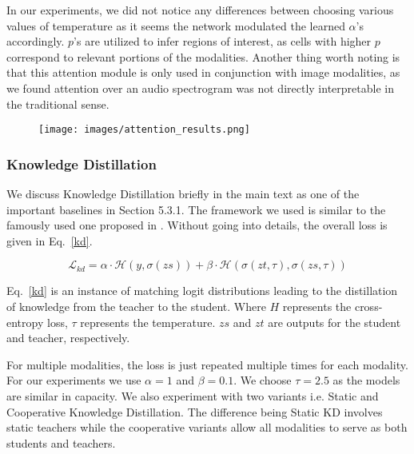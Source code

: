 \documentclass[final]{cvpr}
\begin{document}
In our experiments, we did not notice any differences between choosing various values of temperature as it seems the network modulated the learned $\alpha$'s accordingly. $p$'s are utilized to infer regions of interest, as cells with higher $p$ correspond to relevant portions of the modalities. Another thing worth noting is that this attention module is only used in conjunction with image modalities, as we found attention over an audio spectrogram was not directly interpretable in the traditional sense.

\begin{figure}[t]
\begin{center}
    \centering
    \texttt{[image: images/attention\_results.png]}
    \label{intuition}
    \centering
\end{center}
\end{figure}

\subsubsection*{Knowledge Distillation}

We discuss Knowledge Distillation briefly in the main text as one of the important baselines in Section 5.3.1. The framework we used is similar to the famously used one proposed in \cite{hinton2015distilling}. Without going into details, the overall loss is given in Eq.~\eqref{kd}.

\begin{equation}
    \label{kd}
    \mathcal{L}_{kd} = \alpha \cdot \mathcal{H}(y, \sigma(zs)) + \beta \cdot \mathcal{H}(\sigma(zt, \tau), \sigma(zs, \tau))
\end{equation}

Eq.~\eqref{kd} is an instance of matching logit distributions leading to the distillation of knowledge from the teacher to the student. Where $H$ represents the cross-entropy loss, $\tau$ represents the temperature. $zs$ and $zt$ are outputs for the student and teacher, respectively.

For multiple modalities, the loss is just repeated multiple times for each modality. For our experiments we use $\alpha=1$ and $\beta=0.1$. We choose $\tau=2.5$ as the models are similar in capacity. We also experiment with two variants i.e. Static and Cooperative Knowledge Distillation. The difference being Static KD involves static teachers while the cooperative variants allow all modalities to serve as both students and teachers.









 
 
\end{document}
